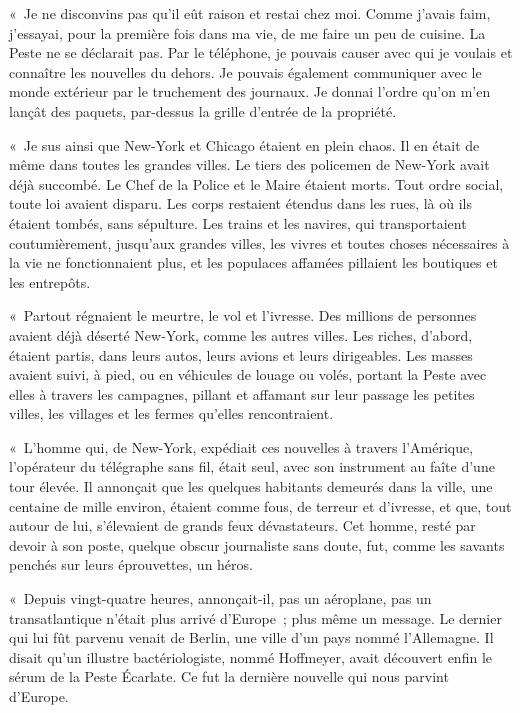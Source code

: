 \documentclass[french,twoside]{book} %
\begin{document}
« Je ne disconvins pas qu’il eût raison et restai chez moi. Comme j’avais faim, j’essayai, pour la première fois dans ma vie, de me faire un peu de cuisine. La Peste ne se déclarait pas. Par le téléphone, je pouvais causer avec qui je voulais et connaître les nouvelles du dehors. Je pouvais également communiquer avec le monde extérieur par le truchement des journaux. Je donnai l’ordre qu’on m’en lançât des paquets, par-dessus la grille d’entrée de la propriété.\par
« Je sus ainsi que New-York et Chicago étaient en plein chaos. Il en était de même dans toutes les grandes villes. Le tiers des policemen de New-York avait déjà succombé. Le Chef de la Police et le Maire étaient morts. Tout ordre social, toute loi avaient disparu. Les corps restaient étendus dans les rues, là où ils étaient tombés, sans sépulture. Les trains et les navires, qui transportaient coutumièrement, jusqu’aux grandes villes, les vivres et toutes choses nécessaires à la vie ne fonctionnaient plus, et les populaces affamées pillaient les boutiques et les entrepôts.\par
« Partout régnaient le meurtre, le vol et l’ivresse. Des millions de personnes avaient déjà déserté New-York, comme les autres villes. Les riches, d’abord, étaient partis, dans leurs autos, leurs avions et leurs dirigeables. Les masses avaient suivi, à pied, ou en véhicules de louage ou volés, portant la Peste avec elles à travers les campagnes, pillant et affamant sur leur passage les petites villes, les villages et les fermes qu’elles rencontraient.\par
« L’homme qui, de New-York, expédiait ces nouvelles à travers l’Amérique, l’opérateur du télégraphe sans fil, était seul, avec son instrument au faîte d’une tour élevée. Il annonçait que les quelques habitants demeurés dans la ville, une centaine de mille environ, étaient comme fous, de terreur et d’ivresse, et que, tout autour de lui, s’élevaient de grands feux dévastateurs. Cet homme, resté par devoir à son poste, quelque obscur journaliste sans doute, fut, comme les savants penchés sur leurs éprouvettes, un héros.\par
« Depuis vingt-quatre heures, annonçait-il, pas un aéroplane, pas un transatlantique n’était plus arrivé d’Europe ; plus même un message. Le dernier qui lui fût parvenu venait de Berlin, une ville d’un pays nommé l’Allemagne. Il disait qu’un illustre bactériologiste, nommé Hoffmeyer, avait découvert enfin le sérum de la Peste Écarlate. Ce fut la dernière nouvelle qui nous parvint d’Europe.\par
\end{document}
